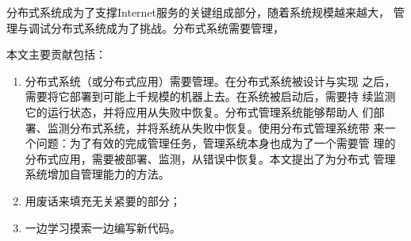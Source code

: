 
 

\makeatletter
\ifthu@bachelor\relax\else
  \ifthu@doctor
  \else
    \ifthu@master
    \fi
  \fi
\fi
\makeatother





\begin{cabstract}


  分布式系统成为了支撑Internet服务的关键组成部分，随着系统规模越来越大，
  管理与调试分布式系统成为了挑战。分布式系统需要管理，

  本文主要贡献包括：

  \begin{enumerate}

    \item 分布式系统（或分布式应用）需要管理。在分布式系统被设计与实现
    之后，需要将它部署到可能上千规模的机器上去。在系统被启动后，需要持
    续监测它的运行状态，并将应用从失败中恢复。分布式管理系统能够帮助人
    们部署、监测分布式系统，并将系统从失败中恢复。使用分布式管理系统带
    来一个问题：为了有效的完成管理任务，管理系统本身也成为了一个需要管
    理的分布式应用，需要被部署、监测，从错误中恢复。本文提出了为分布式
    管理系统增加自管理能力的方法。

    \item 用废话来填充无关紧要的部分；

    \item 一边学习摸索一边编写新代码。

  \end{enumerate}

\end{cabstract}

